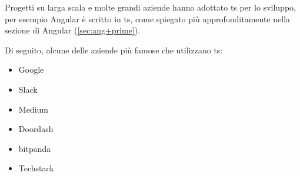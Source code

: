 Progetti su larga scala e molte grandi aziende hanno adottato \acrlong{ts} per lo sviluppo, per esempio Angular è scritto in \acrlong{ts}, come spiegato più approfonditamente nella sezione di Angular (\ref{sec:ang+prime}).

Di seguito, alcune delle aziende più famose che utilizzano \acrlong{ts}:
\begin{itemize}
    \item Google
    \item Slack
    \item Medium
    \item Doordash
    \item bitpanda
    \item Techstack
\end{itemize}


